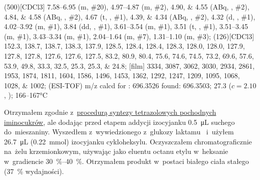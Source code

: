 \begin{fullexp}
	\NMR(500)[CDCl3] \numrange{7.58}{6.95} (m, \#{20}), \numrange{4.97}{4.87} (m, \#{2}), \numlist{4.90;4.55} (ABq, , \#{2}), \numlist{4.84;4.58} (ABq, , \#{2}), \num{4.67} (t, , \#{1}), \numlist{4.39;4.34} (ABq, , \#{2}), \num{4.32} (d, , \#{1}), \numrange{4.02}{3.92} (m, \#{1}), \num{3.84} (dd, , \#{1}), \numrange{3.61}{3.54} (m, \#{1}), \num{3.51} (t, , \#{1}), \numrange{3.51}{3.45} (m, \#{1}), \numrange{3.43}{3.34} (m, \#{1}), \numrange{2.04}{1.64} (m, \#{7}), \numrange{1.31}{1.10} (m, \#{3});
	(126)[CDCl3] \numlist{152.3; 138.7; 138.7; 138.3; 137.9; 128.5; 128.4; 128.4; 128.3; 128.0; 128.0; 127.9; 127.8; 127.8; 127.6; 127.6; 127.5; 83.2; 80.9; 80.4; 75.6; 74.6; 74.5; 73.2; 69.6; 57.6; 53.9; 49.8; 33.3; 32.5; 25.3; 25.3; 24.8};
	[film] \numlist{3334; 3087; 3062; 3030; 2934; 2861; 1953; 1874; 1811; 1604; 1586; 1496; 1453; 1362; 1292; 1247; 1209; 1095; 1068; 1028; 1002};
	 (ESI-TOF) m/z calcd for : \num{696.3526} found: \num{696.3503};
	\data{[$\alpha^{23}_D$]~$=$} \num{27.3} ($c = 2.10$, );
	 \numrange{166}{167}\si{\celsius}
\end{fullexp}

Otrzymałem zgodnie z~\hyperref[experimental:sugars:schwartz]{procedurą syntezy tetrazolowych
	pochodnych iminocukrów}, ale dodając przed etapem addycji izocyjanku
	\SI{0.5}{\micro\liter} suchego  do~mieszaniny.
Wyszedłem z~wywiedzionego z~glukozy laktamu~
	i~użyłem \SI{26.7}{\micro\liter} (\SI{0.22}{\milli\mol}) izocyjanku cykloheksylu.
Oczyszczałem chromatograficznie na~żelu krzemionkowym,
	używając jako eluentu octanu etylu w~heksanie w~gradiencie \SIrange{30}{40}{\percent}.
Otrzymałem produkt w~postaci białego ciała stałego (\SI{37}{\percent} wydajności).

